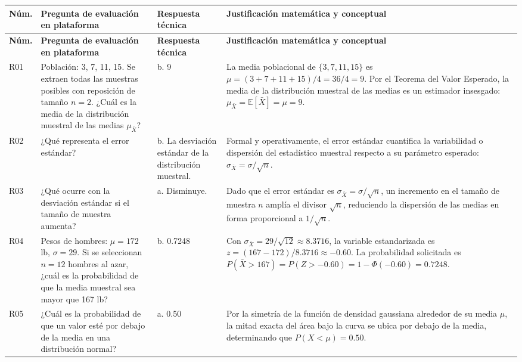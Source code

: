 {\begin{center}
\renewcommand{\arraystretch}{1.28}
\begin{longtable}{p{1.2cm}p{4.3cm}p{3.8cm}p{5.3cm}}
\hline
\textbf{Núm.} & \textbf{Pregunta de evaluación en plataforma} & \textbf{Respuesta técnica} & \textbf{Justificación matemática y conceptual}\\\hline
\endfirsthead
\hline
\textbf{Núm.} & \textbf{Pregunta de evaluación en plataforma} & \textbf{Respuesta técnica} & \textbf{Justificación matemática y conceptual}\\\hline
\endhead
R01 & Población: {3, 7, 11, 15}. Se extraen todas las muestras posibles con reposición de tamaño $n = 2$. ¿Cuál es la media de la distribución muestral de las medias $\mu_{\bar{X}}$? & b. 9 & La media poblacional de $\{3, 7, 11, 15\}$ es $\mu = (3+7+11+15)/4 = 36/4 = 9$. Por el Teorema del Valor Esperado, la media de la distribución muestral de las medias es un estimador insesgado: $\mu_{\bar{X}} = \mathbb{E}[\bar{X}] = \mu = 9$. \citep{anderson2012,wackerly2010} \\\hline
R02 & ¿Qué representa el error estándar? & b. La desviación estándar de la distribución muestral. & Formal y operativamente, el error estándar cuantifica la variabilidad o dispersión del estadístico muestral respecto a su parámetro esperado: $\sigma_{\bar{X}} = \sigma / \sqrt{n}$. \citep{anderson2012,wackerly2010} \\\hline
R03 & ¿Qué ocurre con la desviación estándar si el tamaño de muestra aumenta? & a. Disminuye. & Dado que el error estándar es $\sigma_{\bar{X}} = \sigma / \sqrt{n}$, un incremento en el tamaño de muestra $n$ amplía el divisor $\sqrt{n}$, reduciendo la dispersión de las medias en forma proporcional a $1/\sqrt{n}$. \citep{anderson2012,lind2012} \\\hline
R04 & Pesos de hombres: $\mu = 172$ lb, $\sigma = 29$. Si se seleccionan $n = 12$ hombres al azar, ¿cuál es la probabilidad de que la media muestral sea mayor que 167 lb? & b. 0.7248 & Con $\sigma_{\bar{X}} = 29 / \sqrt{12} \approx 8.3716$, la variable estandarizada es $z = (167 - 172)/8.3716 \approx -0.60$. La probabilidad solicitada es $P(\bar{X} > 167) = P(Z > -0.60) = 1 - \Phi(-0.60) = 0.7248$. \citep{anderson2012,wackerly2010} \\\hline
R05 & ¿Cuál es la probabilidad de que un valor esté por debajo de la media en una distribución normal? & a. 0.50 & Por la simetría de la función de densidad gaussiana alrededor de su media $\mu$, la mitad exacta del área bajo la curva se ubica por debajo de la media, determinando que $P(X < \mu) = 0.50$. \citep{anderson2012,canavos1988} \\\hline

\end{longtable}
\end{center}}
